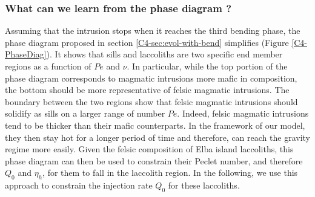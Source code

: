 \subsubsection*{What can we learn from the phase diagram ?}

Assuming that  the intrusion stops  when it reaches the  third bending
phase,     the      phase     diagram     proposed      in     section
\ref{C4-sec:evol-with-bend}  simplifies  (Figure  \ref{C4-PhaseDiag}).
It shows that sills and laccoliths are two specific end member regions
as a function of $Pe$ and  $\nu$. In particular, while the top portion
of the phase diagram corresponds  to magmatic intrusions more mafic in
composition,  the  bottom  should  be more  representative  of  felsic
magmatic intrusions.  The  boundary between the two  regions show that
felsic magmatic intrusions should solidify  as sills on a larger range
of number $Pe$. Indeed, felsic  magmatic intrusions tend to be thicker
than their  mafic counterparts.  In  the framework of our  model, they
then stay hot for a longer period of time and therefore, can reach the
gravity  regime more  easily.  Given  the felsic  composition of  Elba
island laccoliths,  this phase diagram  can then be used  to constrain
their Peclet  number, and  therefore $Q_0$ and  $\eta_h$, for  them to
fall in the  laccolith region. In the following, we  use this approach
to constrain the injection rate $Q_0$ for these laccoliths.


